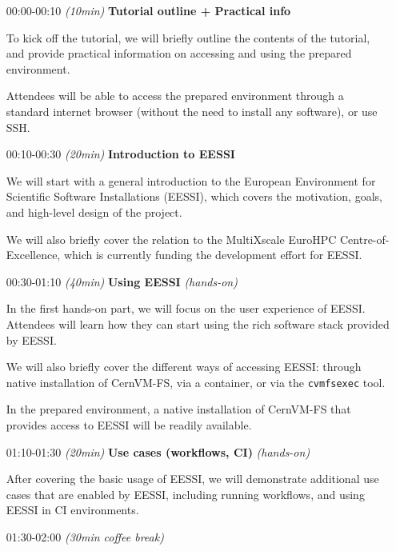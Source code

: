 \begin{itemize}[style=standard, labelwidth=1.9cm]


    \item [00:00-00:10] \emph{(10min)} \textbf{Tutorial outline + Practical info}

        To kick off the tutorial, we will briefly outline the contents of the tutorial,
        and provide practical information on accessing and using the prepared environment.

        Attendees will be able to access the prepared environment through a standard internet browser
        (without the need to install any software), or use SSH.

    \item [00:10-00:30] \emph{(20min)} \textbf{Introduction to EESSI}

        We will start with a general introduction to the European Environment for Scientific Software
        Installations (EESSI), which covers the motivation, goals, and high-level design of the project.

        We will also briefly cover the relation to the MultiXscale EuroHPC Centre-of-Excellence,
        which is currently funding the development effort for EESSI.

    \item [00:30-01:10] \emph{(40min)} \textbf{Using EESSI} \emph{(hands-on)}

        In the first hands-on part, we will focus on the user experience of EESSI.
        Attendees will learn how they can start using the rich software stack provided by EESSI.

        We will also briefly cover the different ways of accessing EESSI: through native installation
        of CernVM-FS, via a container, or via the \texttt{cvmfsexec} tool.

        In the prepared environment, a native installation of CernVM-FS that provides access to EESSI
        will be readily available.

    \item [01:10-01:30] \emph{(20min)} \textbf{Use cases (workflows, CI)} \emph{(hands-on)}

        After covering the basic usage of EESSI, we will demonstrate additional use cases that
        are enabled by EESSI, including running workflows, and using EESSI in CI environments.

 \item [01:30-02:00] \emph{(30min coffee break)}


\end{itemize}
